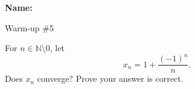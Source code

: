 \documentclass[12pt]{article}
\begin{document}
\noindent \textbf{Name:} 

\begin{center}
Warm-up \#5
\end{center}

\noindent For $n \in \mathbb{N} \setminus 0$, let 
\[
x_n = 1 + \frac{(-1)^n}{n}.
\]
Does $x_n$ converge? Prove your answer is correct. 
\end{document}
